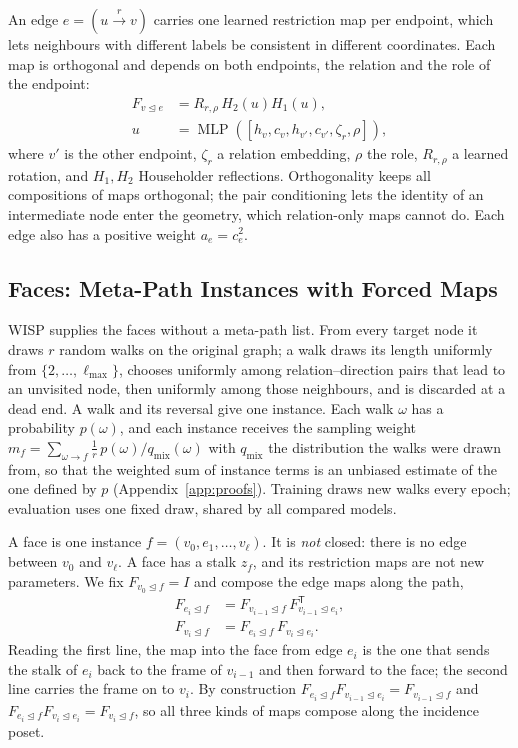 \documentclass{article}
\newcommand{\wisp}{\textsc{WISP}}
\newcommand{\transpose}{\mathsf{T}}
\newcommand{\inc}{\trianglelefteq}
\begin{document}
An edge $e=(u\xrightarrow{r}v)$ carries one learned restriction map per endpoint, which lets neighbours with different labels be consistent in different coordinates. Each map is orthogonal and depends on both endpoints, the relation and the role of the endpoint:
\begin{equation}
\begin{aligned}
  F_{v\inc e}&=R_{r,\rho}\,H_2(u)H_1(u),\\
  u&=\operatorname{MLP}([h_v,c_v,h_{v'},c_{v'},\zeta_r,\rho]),
\end{aligned}
  \label{eq:maps}
\end{equation}
where $v'$ is the other endpoint, $\zeta_r$ a relation embedding, $\rho$ the role, $R_{r,\rho}$ a learned rotation, and $H_1,H_2$ Householder reflections. Orthogonality keeps all compositions of maps orthogonal; the pair conditioning lets the identity of an intermediate node enter the geometry, which relation-only maps cannot do. Each edge also has a positive weight $a_e=c_e^2$.

\subsection{Faces: Meta-Path Instances with Forced Maps}
\label{sec:wisp}
\wisp{} supplies the faces without a meta-path list. From every target node it draws $r$ random walks on the original graph; a walk draws its length uniformly from $\{2,\ldots,\ell_{\max}\}$, chooses uniformly among relation--direction pairs that lead to an unvisited node, then uniformly among those neighbours, and is discarded at a dead end. A walk and its reversal give one instance. Each walk $\omega$ has a probability $p(\omega)$, and each instance receives the sampling weight $m_f=\sum_{\omega\to f}\frac1r\,p(\omega)/q_{\mathrm{mix}}(\omega)$ with $q_{\mathrm{mix}}$ the distribution the walks were drawn from, so that the weighted sum of instance terms is an unbiased estimate of the one defined by $p$ (Appendix~\ref{app:proofs}). Training draws new walks every epoch; evaluation uses one fixed draw, shared by all compared models.

A face is one instance $f=(v_0,e_1,\ldots,v_\ell)$. It is \emph{not} closed: there is no edge between $v_0$ and $v_\ell$. A face has a stalk $z_f$, and its restriction maps are not new parameters. We fix $F_{v_0\inc f}=I$ and compose the edge maps along the path,
\begin{equation}
\begin{aligned}
  F_{e_i\inc f}&=F_{v_{i-1}\inc f}\,F_{v_{i-1}\inc e_i}^{\transpose},\\
  F_{v_i\inc f}&=F_{e_i\inc f}\,F_{v_i\inc e_i}.
\end{aligned}
\label{eq:forced}
\end{equation}
Reading the first line, the map into the face from edge $e_i$ is the one that sends the stalk of $e_i$ back to the frame of $v_{i-1}$ and then forward to the face; the second line carries the frame on to $v_i$. By construction $F_{e_i\inc f}F_{v_{i-1}\inc e_i}=F_{v_{i-1}\inc f}$ and $F_{e_i\inc f}F_{v_i\inc e_i}=F_{v_i\inc f}$, so all three kinds of maps compose along the incidence poset.
\end{document}
